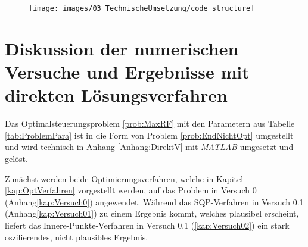 \begin{figure}[H]
    \centering
    \texttt{[image: images/03\_TechnischeUmsetzung/code\_structure]}
    \label{fig:code_structure}
\end{figure}













\section{Diskussion der numerischen Versuche und Ergebnisse mit direkten Lösungsverfahren}
Das Optimalsteuerungsproblem \ref{prob:MaxRF} mit den Parametern aus Tabelle \ref{tab:ProblemPara} ist in die Form von Problem \ref{prob:EndNichtOpt} umgestellt und wird technisch in Anhang \ref{Anhang:DirektV} mit \textit{MATLAB} umgesetzt und gelöst.

Zunächst werden beide Optimierungsverfahren, welche in Kapitel \ref{kap:OptVerfahren} vorgestellt werden, auf das Problem in Versuch 0 (Anhang\ref{kap:Versuch0}) angewendet. Während das SQP-Verfahren in Versuch 0.1 (Anhang\ref{kap:Versuch01}) zu einem Ergebnis kommt, welches plausibel erscheint, liefert das Innere-Punkte-Verfahren in Versuch 0.1 (\ref{kap:Versuch02}) ein stark oszilierendes, nicht plausibles Ergebnis.

